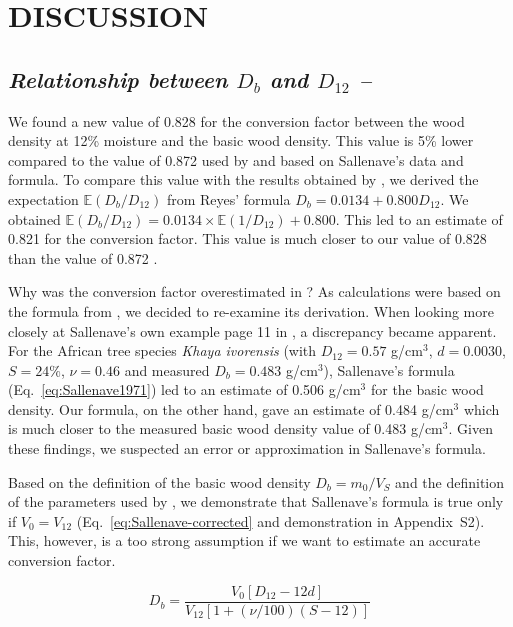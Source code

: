 \documentclass[a4paper, 12pt, leqno, dvipsnames]{article}\usepackage[]{graphicx}\usepackage[]{color}
\begin{document}
\newpage

\section*{DISCUSSION}

\subsection*{\textit{Relationship between $D_b$ and $D_{12}$ --}}

We found a new value of 0.828 for the conversion factor between the wood density at 12\% moisture and the basic wood density. This value is 5\% lower compared to the value of 0.872 used by \citet{Chave2006} and based on Sallenave's data and formula. To compare this value with the results obtained by \citet{Reyes1992}, we derived the expectation $\mathbb{E}(D_b/D_{12})$ from Reyes' formula $D_b = 0.0134 + 0.800 D_{12}$. We obtained $\mathbb{E}(D_b/D_{12}) = 0.0134 \times \mathbb{E}(1/D_{12}) + 0.800$. This led to an estimate of 0.821 for the conversion factor. This value is much closer to our value of 0.828 than the value of 0.872 \citep{Chave2006}. 

Why was the conversion factor overestimated in \citet{Chave2006}? As calculations were based on the formula from \citet{Sallenave1971}, we decided to re-examine its derivation. When looking more closely at Sallenave's own example page 11 in \citet{Sallenave1971}, a discrepancy became apparent. For the African tree species \emph{Khaya ivorensis} (with $D_{12}=0.57$ g/cm$^3$, $d=0.0030$, $S=24\%$, $\nu=0.46$ and measured $D_b=0.483$ g/cm$^3$), Sallenave's formula (Eq.~\ref{eq:Sallenave1971}) led to an estimate of 0.506 g/cm$^3$ for the basic wood density. Our formula, on the other hand, gave an estimate of 0.484 g/cm$^3$ which is much closer to the measured basic wood density value of 0.483 g/cm$^3$. Given these findings, we suspected an error or approximation in Sallenave's formula.

Based on the definition of the basic wood density $D_b=m_0/V_S$ and the definition of the parameters used by \citet{Sallenave1971}, we demonstrate that Sallenave's formula is true only if $V_0=V_{12}$ (Eq.~\ref{eq:Sallenave-corrected} and demonstration in Appendix~S2). This, however, is a too strong assumption if we want to estimate an accurate conversion factor.

\begin{equation}
  D_b=\frac{V_0[D_{12} - 12 d]}{V_{12}[1+(\nu/100)(S-12)]}
  \label{eq:Sallenave-corrected}
\end{equation}
\end{document}
